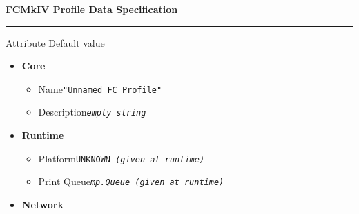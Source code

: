 \documentclass{article}
\newcommand{\dt}[1]{\dotfill \texttt{#1}}
\newcommand{\vp}{\vspace{1em}}
\newcommand{\es}{\textit{empty string}}
\begin{document}
\textbf{\Large FCMkIV Profile Data Specification}
\vp

\hrule

\begin{multicols}{2}

\small

Attribute \hfill Default value

\begin{itemize}

\item \textbf{Core}

    \begin{itemize}
        \item Name\dt{"Unnamed FC Profile"}
        \item Description\dt{\es}
    \end{itemize}

\item \textbf{Runtime}

    \begin{itemize}
        \item Platform\dt{UNKNOWN \textit{(given at runtime)}}
        \item Print Queue\dt{\textit{mp.Queue (given at runtime)}}
    \end{itemize}

\item \textbf{Network}


\end{itemize}
\end{multicols}
\end{document}
